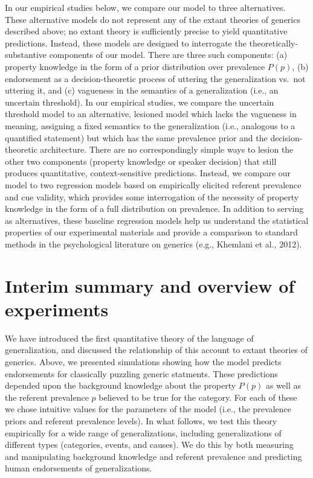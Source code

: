 \documentclass[english,,man,floatsintext]{apa6}
\theoremstyle{definition}
\theoremstyle{definition}
\theoremstyle{definition}
\theoremstyle{remark}
\begin{document}
In our empirical studies below, we compare our model to three
alternatives. These alternative models do not represent any of the
extant theories of generics described above; no extant theory is
sufficiently precise to yield quantitative predictions. Instead, these
models are designed to interrogate the theoretically-substantive
components of our model. There are three such components: (a) property
knowledge in the form of a prior distribution over prevalence \(P(p)\),
(b) endorsement as a decision-theoretic process of uttering the
generalization vs.~not uttering it, and (c) vagueness in the semantics
of a generalization (i.e., an uncertain threshold). In our empirical
studies, we compare the uncertain threshold model to an alternative,
lesioned model which lacks the vagueness in meaning, assigning a fixed
semantics to the generalization (i.e., analogous to a quantified
statement) but which has the same prevalence prior and the
decision-theoretic architecture. There are no correspondingly simple
ways to lesion the other two components (property knowledge or speaker
decision) that still produces quantitative, context-sensitive
predictions. Instead, we compare our model to two regression models
based on empirically elicited referent prevalence and cue validity,
which provides some interrogation of the necessity of property knowledge
in the form of a full distribution on prevalence. In addition to serving
as alternatives, these baseline regression models help us understand the
statistical properties of our experimental materials and provide a
comparison to standard methods in the psychological literature on
generics (e.g., Khemlani et al., 2012).

\hypertarget{interim-summary-and-overview-of-experiments}{%
\section{Interim summary and overview of
experiments}\label{interim-summary-and-overview-of-experiments}}

We have introduced the first quantitative theory of the language of
generalization, and discussed the relationship of this account to extant
theories of generics. Above, we presented simulations showing how the
model predicts endorsements for classically puzzling generic statments.
These predictions depended upon the background knowledge about the
property \(P(p)\) as well as the referent prevalence \(p\) believed to
be true for the category. For each of these we chose intuitive values
for the parameters of the model (i.e., the prevalence priors and
referent prevalence levels). In what follows, we test this theory
empirically for a wide range of generalizations, including
generalizations of different types (categories, events, and causes). We
do this by both measuring and manipulating background knowledge and
referent prevalence and predicting human endorsements of
generalizations.
\end{document}

